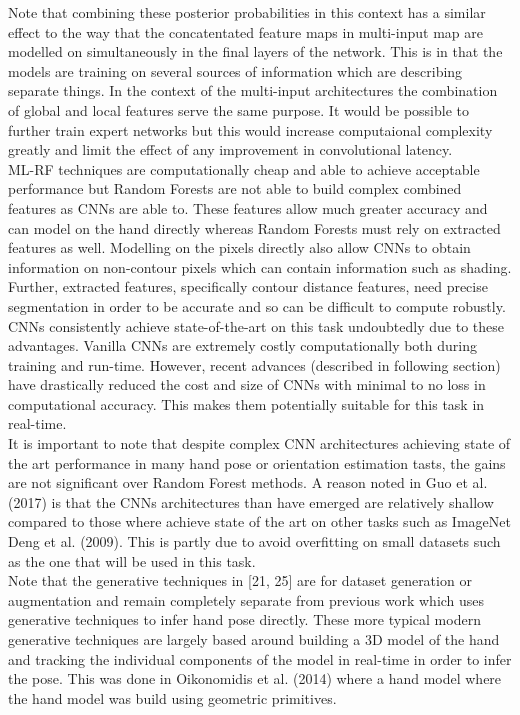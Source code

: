 \documentclass{article}
\begin{document}
Note that combining these posterior probabilities in this context has a similar effect to the way that the concatentated feature maps in multi-input map are modelled on simultaneously in the final layers of the network. This is in that the models are training on several sources of information which are describing separate things. In the context of the multi-input architectures the combination of global and local features serve the same purpose. It would be possible to further train expert networks but this would increase computaional complexity greatly and limit the effect of any improvement in convolutional latency. \\

ML-RF techniques are computationally cheap and able to achieve acceptable performance but Random Forests are not able to build complex combined features as CNNs are able to. These features allow much greater accuracy and can model on the hand directly whereas Random Forests must rely on extracted features as well. Modelling on the pixels directly also allow CNNs to obtain information on non-contour pixels which can contain information such as shading. Further, extracted features, specifically contour distance features, need precise segmentation in order to be accurate and so can be difficult to compute robustly. \\

 CNNs consistently achieve state-of-the-art on this task undoubtedly due to these advantages. Vanilla CNNs are extremely costly computationally both during training and run-time. However, recent advances (described in following section) have drastically reduced the cost and size of CNNs with minimal to no loss in computational accuracy. This makes them potentially suitable for this task in real-time. \\

It is important to note that despite complex CNN architectures achieving state of the art performance in many hand pose or orientation estimation tasts, the gains are not significant over Random Forest methods. A reason noted in Guo et al. (2017) is that the CNNs architectures than have emerged are relatively shallow compared to those where achieve state of the art on other tasks such as ImageNet Deng et al. (2009). This is partly due to avoid overfitting on small datasets such as the one that will be used in this task. \\

Note that the generative techniques in [21, 25] are for dataset generation or augmentation and remain completely separate from previous work which uses generative techniques to infer hand pose directly. These more typical modern generative techniques are largely based around building a 3D model of the hand and tracking the individual components of the model in real-time in order to infer the pose. This was done  in Oikonomidis et al. (2014) where a hand model  where the hand model was build using geometric primitives.\\
\end{document}
